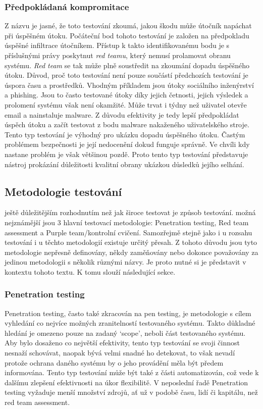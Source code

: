 \subsubsection{Předpokládaná kompromitace}
Z názvu je jasné, že toto testování zkoumá, jakou škodu může útočník napáchat při úspěšném útoku.
Počáteční bod tohoto testování je založen na předpokladu úspěšné infiltrace útočníkem.
Přístup k takto identifikovanému bodu je s příslušnými právy poskytnut \textit{red teamu}, který nemusí prolamovat obranu systému.
\textit{Red team} se tak může plně soustředit na zkoumání dopadu úspěšného útoku.
Důvod, proč toto testování není pouze součástí předchozích testování je úspora času a prostředků.
Vhodným příkladem jsou útoky sociálního inženýrství a phishing.
Jsou to často testované útoky díky jejich četnosti, jejich výsledek a prolomení systému však není okamžité.
Může trvat i týdny než uživatel otevře email a nainstaluje malware.\cite{red_team_oakley_2019}
Z důvodu efektivity je tedy lepší předpokládat úspěch útoku a začít testovat z bodu malware nakaženého uživatelského stroje.
Tento typ testování je výhodný pro ukázku dopadu úspěšného útoku.
Častým problémem bezpečnosti je její nedocenění dokud funguje správně.
Ve chvíli kdy nastane problém je však většinou pozdě.
Proto tento typ testování představuje nástroj prokázání důležitosti kvalitní obrany ukázkou důsledků jejího selhání.

\subsection{Metodologie testování}
ještě důležitějším rozhodnutím než jak široce testovat je způsob testování.
možná nejznámější jsou 3 hlavní testovací metodologie: Penetration testing, Red team assessment a Purple team/kontrolní cvičení.
Samozřejmě stejně jako i u rozsahu testování i u těchto metodologií existuje určitý přesah.
Z tohoto důvodu jsou tyto metodologie nepřesně definovány, někdy zaměňovány nebo dokonce považovány za jedinou metodologii s několik různými názvy.
Je proto nutné si je představit v kontextu tohoto textu.
K tomu slouží následující sekce.\cite{securityInteligence_pen_test_red_team_purple_team}

\subsubsection{Penetration testing}

Penetration testing, často také zkracován na pen testing, je metodologie s cílem vyhledání co nejvíce možných zranitelností testovaného systému.
Takto důkladné hledání je omezeno pouze na zadaný `scope', neboli část testovaného systému.
Aby bylo dosaženo co největší efektivity, tento typ testování se svoji činnost nesnaží schovávat, naopak bývá velmi snadné ho detekovat, to však nevadí protože ochrana daného systému by o jeho provádění měla být předem informována.
Tento typ testování může být také z části automatizován, což vede k dalšímu zlepšení efektivnosti na úkor flexibilitě.
V neposlední řadě Penetration testing vyžaduje menší množství zdrojů, ať už v podobě času, lidí či kapitálu, než red team assessment.
